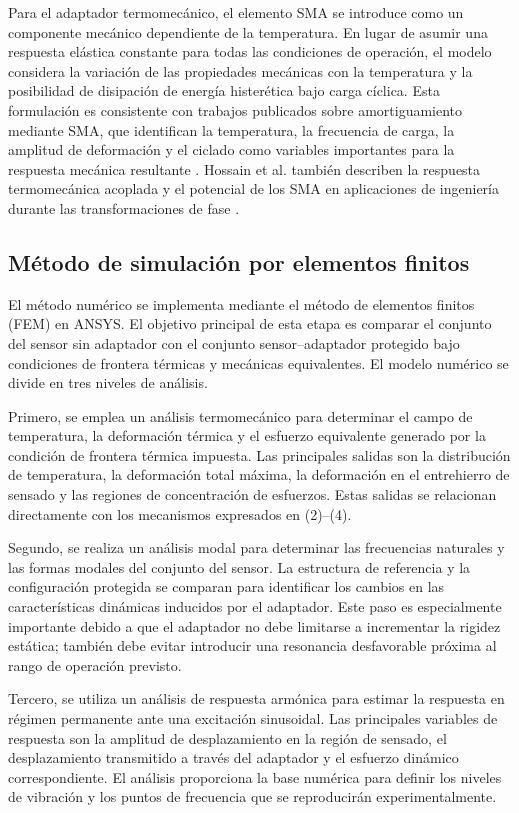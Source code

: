 \documentclass[conference]{IEEEtran}
\begin{document}
Para el adaptador termomecánico, el elemento SMA se introduce como un componente mecánico dependiente de la temperatura. En lugar de asumir una respuesta elástica constante para todas las condiciones de operación, el modelo considera la variación de las propiedades mecánicas con la temperatura y la posibilidad de disipación de energía histerética bajo carga cíclica. Esta formulación es consistente con trabajos publicados sobre amortiguamiento mediante SMA, que identifican la temperatura, la frecuencia de carga, la amplitud de deformación y el ciclado como variables importantes para la respuesta mecánica resultante \cite{Saedi2023,Davarnia2025}. Hossain et al. también describen la respuesta termomecánica acoplada y el potencial de los SMA en aplicaciones de ingeniería durante las transformaciones de fase \cite{Hossain2025}.

\subsection{Método de simulación por elementos finitos}

El método numérico se implementa mediante el método de elementos finitos (FEM) en ANSYS. El objetivo principal de esta etapa es comparar el conjunto del sensor sin adaptador con el conjunto sensor--adaptador protegido bajo condiciones de frontera térmicas y mecánicas equivalentes. El modelo numérico se divide en tres niveles de análisis.

Primero, se emplea un análisis termomecánico para determinar el campo de temperatura, la deformación térmica y el esfuerzo equivalente generado por la condición de frontera térmica impuesta. Las principales salidas son la distribución de temperatura, la deformación total máxima, la deformación en el entrehierro de sensado y las regiones de concentración de esfuerzos. Estas salidas se relacionan directamente con los mecanismos expresados en (2)--(4).

Segundo, se realiza un análisis modal para determinar las frecuencias naturales y las formas modales del conjunto del sensor. La estructura de referencia y la configuración protegida se comparan para identificar los cambios en las características dinámicas inducidos por el adaptador. Este paso es especialmente importante debido a que el adaptador no debe limitarse a incrementar la rigidez estática; también debe evitar introducir una resonancia desfavorable próxima al rango de operación previsto.

Tercero, se utiliza un análisis de respuesta armónica para estimar la respuesta en régimen permanente ante una excitación sinusoidal. Las principales variables de respuesta son la amplitud de desplazamiento en la región de sensado, el desplazamiento transmitido a través del adaptador y el esfuerzo dinámico correspondiente. El análisis proporciona la base numérica para definir los niveles de vibración y los puntos de frecuencia que se reproducirán experimentalmente.
\end{document}
